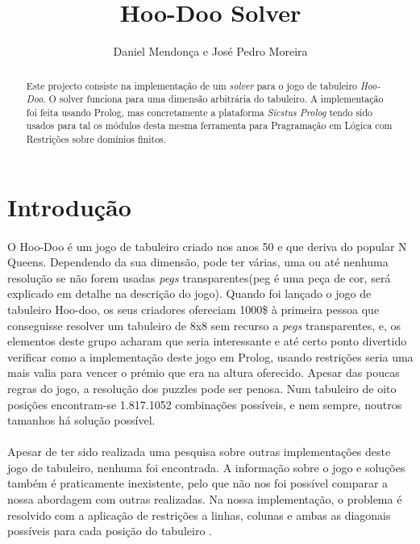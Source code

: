 \documentclass{llncs}
\begin{document}
\title{Hoo-Doo Solver}

\author{Daniel Mendon\c{c}a e Jos\'{e} Pedro Moreira}


\maketitle
%
\begin{abstract}
Este projecto consiste na implementa\c{c}\~{a}o de um \textit{solver} para o jogo de tabuleiro \textit{Hoo-Doo}. O solver funciona para uma dimens\~{a}o arbitr\'{a}ria do tabuleiro. A implementa\c{c}\~{a}o foi feita usando Prolog, mas concretamente a plataforma \emph{Sicstus Prolog}  tendo sido usados para tal os m\'{o}dulos desta mesma ferramenta para Pragrama\c{c}\~{a}o em L\'{o}gica com Restri\c{c}\~{o}es sobre dom\'{i}nios finitos.
\end{abstract}
%
\section{Introdu\c{c}\~{a}o}
\paragraph*{}
O Hoo-Doo é um jogo de tabuleiro criado nos anos 50 e que deriva do popular N Queens. Dependendo da sua dimens\~{a}o, pode ter v\'{a}rias, uma ou at\'{e} nenhuma resolu\c{c}\~{a}o se n\~{a}o forem usadas \emph{pegs} transparentes(peg \'{e} uma pe\c{c}a de cor, ser\'{a} explicado em detalhe na descri\c{c}\~{a}o do jogo). Quando foi lan\c{c}ado o jogo de tabuleiro Hoo-doo, os seus criadores ofereciam 1000\$ \`{a} primeira pessoa que conseguisse resolver um tabuleiro de 8x8 sem recurso a \emph{pegs} transparentes, e, os elementos deste grupo acharam que seria interessante e at\'{e} certo ponto divertido verificar como a implementa\c{c}\~{a}o deste jogo em Prolog, usando restri\c{c}\~{o}es seria uma mais valia para vencer o pr\'{e}mio que era na altura oferecido. Apesar das poucas regras do jogo, a resolução dos puzzles pode ser penosa. Num tabuleiro de oito posições encontram-se 1.817.1052 combinações possíveis, e nem sempre, noutros tamanhos há solução possível.
\paragraph*{}
Apesar de ter sido realizada uma pesquisa sobre outras implementações deste jogo de tabuleiro, nenhuma foi encontrada. A informação sobre o jogo e soluções também é praticamente inexistente, pelo que não nos foi possível comparar a nossa abordagem com outras realizadas. Na nossa implementação, o problema é resolvido com a aplicação de restrições a linhas, colunas e ambas as diagonais possíveis para cada posição do tabuleiro .
\end{document}

